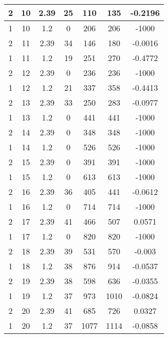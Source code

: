 \documentclass[letterpaper, 12pt]{article}
\begin{document}
\begin{longtable}{|c|c|c|c|c|c|c|}
\hline
2 & 10 & 2.39 & 25 & 110 & 135 & -0.2196 \\
\hline
1 & 10 & 1.2 & 0 & 206 & 206 & -1000 \\
\hline
2 & 11 & 2.39 & 34 & 146 & 180 & -0.0016 \\
\hline
1 & 11 & 1.2 & 19 & 251 & 270 & -0.4772 \\
\hline
2 & 12 & 2.39 & 0 & 236 & 236 & -1000 \\
\hline
1 & 12 & 1.2 & 21 & 337 & 358 & -0.4413 \\
\hline
2 & 13 & 2.39 & 33 & 250 & 283 & -0.0977 \\
\hline
1 & 13 & 1.2 & 0 & 441 & 441 & -1000 \\
\hline
2 & 14 & 2.39 & 0 & 348 & 348 & -1000 \\
\hline
1 & 14 & 1.2 & 0 & 526 & 526 & -1000 \\
\hline
2 & 15 & 2.39 & 0 & 391 & 391 & -1000 \\
\hline
1 & 15 & 1.2 & 0 & 613 & 613 & -1000 \\
\hline
2 & 16 & 2.39 & 36 & 405 & 441 & -0.0612 \\
\hline
1 & 16 & 1.2 & 0 & 714 & 714 & -1000 \\
\hline
2 & 17 & 2.39 & 41 & 466 & 507 & 0.0571 \\
\hline
1 & 17 & 1.2 & 0 & 820 & 820 & -1000 \\
\hline
2 & 18 & 2.39 & 39 & 531 & 570 & -0.003 \\
\hline
1 & 18 & 1.2 & 38 & 876 & 914 & -0.0537 \\
\hline
2 & 19 & 2.39 & 38 & 598 & 636 & -0.0355 \\
\hline
1 & 19 & 1.2 & 37 & 973 & 1010 & -0.0824 \\
\hline
2 & 20 & 2.39 & 41 & 685 & 726 & 0.0327 \\
\hline
1 & 20 & 1.2 & 37 & 1077 & 1114 & -0.0858 \\
\hline
\end{longtable}
\end{document}
